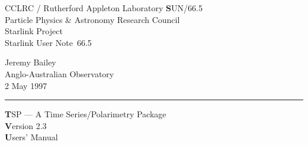 \documentclass[11pt,twoside]{article}
\newcommand{\stardoccategory}  {Starlink User Note}
\newcommand{\stardocinitials}  {SUN}
\newcommand{\stardocnumber}    {66.5}
\newcommand{\stardocname}      {\stardocinitials/\stardocnumber}
\newcommand{\stardocauthors}   {Jeremy Bailey\\
                                Anglo-Australian Observatory}
\newcommand{\stardocdate}      {2 May 1997}
\newcommand{\stardocversion}   {Version 2.3}
\newcommand{\stardocmanual}    {Users' Manual}
\newcommand{\stardoctitle}     {TSP --- A Time Series/Polarimetry Package}
\newenvironment{latexonly}{}{}
\renewcommand{\_}{\texttt{\symbol{95}}}
\begin{document}
\thispagestyle{empty}

\begin{latexonly}
   CCLRC / {\textsc Rutherford Appleton Laboratory} \hfill {\textbf \stardocname}\\
   {\large Particle Physics \& Astronomy Research Council}\\
   {\large Starlink Project\\}
   {\large \stardoccategory\ \stardocnumber}
   \begin{flushright}
   \stardocauthors\\
   \stardocdate
   \end{flushright}
   \vspace{-4mm}
   \rule{\textwidth}{0.5mm}
   \vspace{5mm}
   \begin{center}
   {\Huge\textbf  \stardoctitle \\ [2.5ex]}
   {\LARGE\textbf \stardocversion \\ [4ex]}
   {\Huge\textbf  \stardocmanual}
   \end{center}
   \vspace{5mm}


\end{latexonly}
\end{document}
